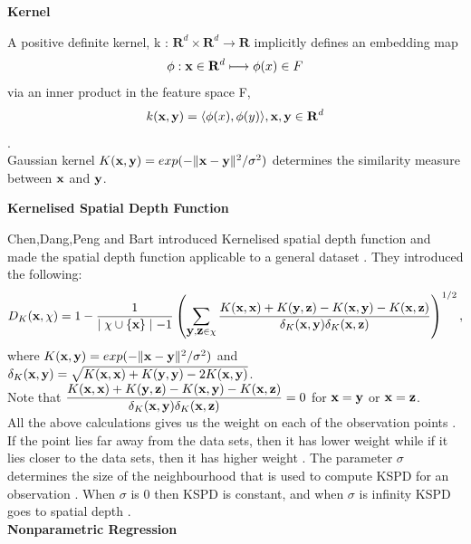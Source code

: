 \documentclass[11pt]{article}
\newcommand{\xvec}{\mbox{\bf x}}
\newcommand{\yvec}{\mbox{\bf y}}
\newcommand{\zvec}{\mbox{\bf z}}
\begin{document}
\begin{flushleft}
\vspace{0.1in}
\textbf{Kernel}
\vspace{0.1in}

A positive definite kernel, k : $\mathbf{R}^d \times \mathbf{R}^d \rightarrow \mathbf{R} $ implicitly defines an embedding map $$ \phi: \xvec \in \mathbf{R}^d \longmapsto \phi(x) \in F$$ via an inner product in the feature space F, $$ k(\xvec,\yvec)=\langle \phi(x),\phi(y) \rangle , \xvec,\yvec \in \mathbf{R}^d$$.\\
Gaussian kernel  $K(\xvec,\yvec)=exp(-\Vert \xvec-\yvec \Vert^2/\sigma^2)$ determines the similarity measure between $\xvec$ and $\yvec$.

\vspace{0.5in}
\textbf{Kernelised Spatial Depth Function}
\vspace{0.1in}

Chen,Dang,Peng and Bart introduced Kernelised spatial depth function and made the spatial depth function applicable to a general dataset . They introduced the following:
$$ D_K(\xvec,\chi)= 1-\frac{1}{\mid \chi \cup \{ \xvec \} \mid-1} \left( \displaystyle{ \sum \limits_{\yvec, \zvec \in \chi} \frac{K(\xvec,\xvec)+K(\yvec,\zvec)-K(\xvec,\yvec)-K(\xvec,\zvec)}{\delta_K(\xvec,\yvec) \delta_K(\xvec,\zvec)}}\right)^{1/2},$$ 
where $K(\xvec,\yvec)=exp(-\Vert \xvec-\yvec \Vert^2/\sigma^2)$ and $\delta_K(\xvec,\yvec)=\sqrt{K(\xvec,\xvec)+K(\yvec,\yvec)-2K(\xvec,\yvec)}$. \\ \vspace{0.1in}
Note that $\displaystyle \frac{K(\xvec,\xvec)+K(\yvec,\zvec)-K(\xvec,\yvec)-K(\xvec,\zvec)}{\delta_K(\xvec,\yvec) \delta_K(\xvec,\zvec)}=0$ for $\xvec=\yvec$ or $\xvec=\zvec$.\\
\vspace{0.2in}
All the above calculations gives us the weight on each of the observation points . If the point lies far away from the data sets, then it has lower weight while if it lies closer to the data sets, then it has higher weight . 
The parameter $\sigma$ determines the size of the neighbourhood that is used to compute KSPD for an observation . When $\sigma$ is 0 then KSPD is constant, and when $\sigma$ is infinity KSPD goes to spatial depth .\\
\vspace{0.1in}
\textbf{Nonparametric Regression}
\vspace{0.1in}


\end{flushleft}
\end{document}
